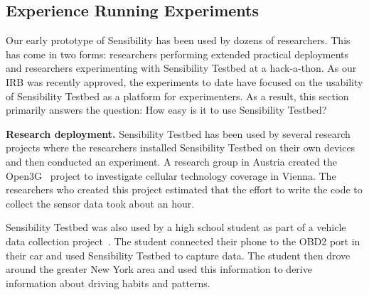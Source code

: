 
\subsection{Experience Running Experiments}\label{sec-deployment}



Our early prototype of Sensibility has been used by dozens of researchers.
This has come in two forms: researchers performing extended practical
deployments and researchers experimenting with Sensibility Testbed at a 
hack-a-thon.  As our IRB was recently approved, the experiments to date have 
focused on the usability of Sensibility Testbed as a platform for 
experimenters.
As a result, this section primarily answers the question: How easy is it to
use Sensibility Testbed?

{\bf Research deployment.}  Sensibility Testbed has been used by 
several research projects where the researchers installed Sensibility
Testbed on their own devices and then conducted an experiment.  
A research group in Austria created the Open3G~\cite{open3g} project to
investigate cellular technology coverage in Vienna.  The researchers
who created this project estimated that the effort to write the code to
collect the sensor data took about an hour.

Sensibility Testbed was also used by a high school student as part of 
a vehicle data collection project~\cite{reininger2015first}.  The student
connected their phone to the OBD2 port in their car and used Sensibility
Testbed to capture data.  The student then drove around the greater
New York area and used this information to derive information about driving
habits and patterns. 


